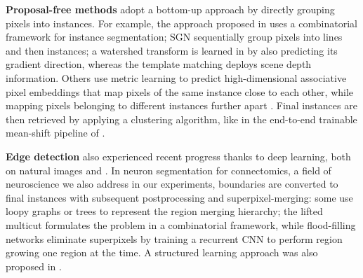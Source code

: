 \textbf{Proposal-free methods} adopt a bottom-up approach by directly grouping pixels into instances. For example, the approach proposed in \cite{kirillov2017instancecut} uses a combinatorial framework for instance segmentation; SGN \cite{liu2017sgn} sequentially group pixels into lines and then instances;
a watershed transform is learned in \cite{bai2017deep} by also predicting its gradient direction, whereas the template matching \cite{uhrig2016pixel} deploys scene depth information.
Others use metric learning to predict high-dimensional associative pixel embeddings that map pixels of the same instance close to each other, while mapping pixels belonging to different instances further apart \cite{fathi2017semantic,newell2017associative,de2017semantic,kulikov2018instance}. %
Final instances are then retrieved by applying a clustering algorithm, like in the end-to-end trainable mean-shift pipeline of \cite{kong2018recurrentPix}.

\textbf{Edge detection} also experienced recent progress thanks to deep learning, both on natural images \cite{xie2015holistically,kokkinos2015pushing} and . In neuron segmentation for connectomics, a field of neuroscience we also address in our experiments, boundaries are converted to final instances with subsequent postprocessing and superpixel-merging:
some use loopy graphs \cite{kaynig2015large,krasowski2015improving} or trees \cite{meirovitch2016multi,liu2016sshmt,liu2014modular,funke2015learning,uzunbas2016efficient} to represent the region merging hierarchy; the lifted multicut \cite{beier2017multicut} formulates the problem in a combinatorial framework, while flood-filling networks \cite{januszewski2018high} eliminate superpixels by training a recurrent CNN to perform region growing one region at the time. A structured learning approach was also proposed in \cite{funke2018large,turaga2009maximin}.

